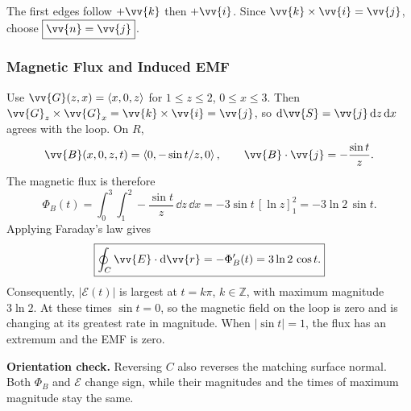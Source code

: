 The first edges follow $+\vv{k}$ then $+\vv{i}$. Since $\vv{k} \times \vv{i} = \vv{j}$, choose $\boxed{\vv{n} = \vv{j}}$.

\newpage
\subsubsection{Magnetic Flux and Induced EMF}
\begin{sol}
Use $\vv{G}(z,x) = \ang{x,0,z}$ for $1 \le z \le 2$, $0 \le x \le 3$.
Then $\vv{G}_z \times \vv{G}_x = \vv{k} \times \vv{i} = \vv{j}$, so
$\dd{\vv{S}} = \vv{j}\,\dd{z}\,\dd{x}$ agrees with the loop. On $R$,
\[
    \vv{B}(x,0,z,t) = \ang{0,-\sin t/z,0},\qquad
    \vv{B}\cdot\vv{j} = -\frac{\sin t}{z}.
\]
The magnetic flux is therefore
\[
    \Phi_B(t) = \int_0^3\!\int_1^2 -\frac{\sin t}{z}\,\dd{z}\,\dd{x}
    = -3\sin t\,[\ln z]_1^2
    = -3\ln 2\,\sin t.
\]
Applying Faraday's law gives
\[
    \boxed{\oint_C \vv{E}\cdot\dd{\vv{r}} = -\Phi_B'(t) = 3\ln 2\,\cos t.}
\]
Consequently, $|\mathcal{E}(t)|$ is largest at $\boxed{t = k\pi}$, $k \in \mathbb{Z}$, with maximum magnitude $3\ln 2$.
At these times $\sin t = 0$, so the magnetic field on the loop is zero and is changing at its greatest rate in magnitude. When $|\sin t| = 1$, the flux has an extremum and the EMF is zero.
\end{sol}

\begin{center}
\end{center}

\textbf{Orientation check.} Reversing $C$ also reverses the matching surface normal. Both $\Phi_B$ and $\mathcal{E}$ change sign, while their magnitudes and the times of maximum magnitude stay the same.
